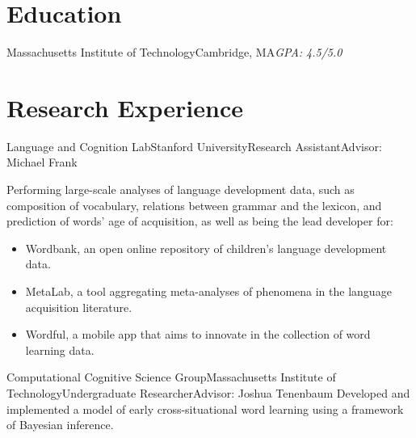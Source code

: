 \documentclass[11pt,letter]{moderncv}
\begin{document}
\makecvtitle

\vspace*{-2\baselineskip}

\section{Education}

{Massachusetts Institute of Technology}{Cambridge, MA}{\textit{GPA: 4.5/5.0}}{}


\vspace*{0.25em}

\section{Research Experience}


{Language and Cognition Lab}{Stanford University}{\newline Research Assistant}{Advisor: Michael Frank}{
%
Performing large-scale analyses of language development data, such as composition of vocabulary, relations between grammar and the lexicon, and prediction of words' age of acquisition, as well as being the lead developer for:
\begin{itemize}
\item Wordbank, an open online repository of children's language development data.
\item MetaLab, a tool aggregating meta-analyses of phenomena in the language acquisition literature.
\item Wordful, a mobile app that aims to innovate in the collection of word learning data.
\end{itemize}
%
}
\vspace*{0.2em}

{Computational Cognitive Science Group}{Massachusetts Institute of Technology}{Undergraduate Researcher}{Advisor: Joshua Tenenbaum}{
%
Developed and implemented a model of early cross-situational word learning using a framework of Bayesian inference.
%
}
\vspace*{0.2em}
\end{document}
